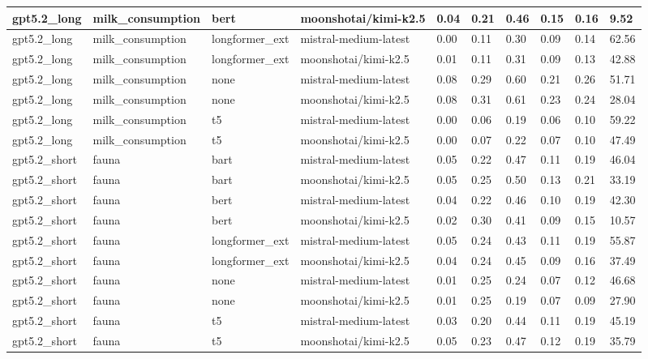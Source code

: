 \begin{tabular}{|l|l|l|l|l|l|l|l|l|l|}
 \hline
 gpt5.2\_long & milk\_consumption & bert & moonshotai/kimi-k2.5 & 0.04 & 0.21 & 0.46 & 0.15 & 0.16 & 9.52 \\
 \hline
 gpt5.2\_long & milk\_consumption & longformer\_ext & mistral-medium-latest & 0.00 & 0.11 & 0.30 & 0.09 & 0.14 & 62.56 \\
 \hline
 gpt5.2\_long & milk\_consumption & longformer\_ext & moonshotai/kimi-k2.5 & 0.01 & 0.11 & 0.31 & 0.09 & 0.13 & 42.88 \\
 \hline
 gpt5.2\_long & milk\_consumption & none & mistral-medium-latest & 0.08 & 0.29 & 0.60 & 0.21 & 0.26 & 51.71 \\
 \hline
 gpt5.2\_long & milk\_consumption & none & moonshotai/kimi-k2.5 & 0.08 & 0.31 & 0.61 & 0.23 & 0.24 & 28.04 \\
 \hline
 gpt5.2\_long & milk\_consumption & t5 & mistral-medium-latest & 0.00 & 0.06 & 0.19 & 0.06 & 0.10 & 59.22 \\
 \hline
 gpt5.2\_long & milk\_consumption & t5 & moonshotai/kimi-k2.5 & 0.00 & 0.07 & 0.22 & 0.07 & 0.10 & 47.49 \\
 \hline
 gpt5.2\_short & fauna & bart & mistral-medium-latest & 0.05 & 0.22 & 0.47 & 0.11 & 0.19 & 46.04 \\
 \hline
 gpt5.2\_short & fauna & bart & moonshotai/kimi-k2.5 & 0.05 & 0.25 & 0.50 & 0.13 & 0.21 & 33.19 \\
 \hline
 gpt5.2\_short & fauna & bert & mistral-medium-latest & 0.04 & 0.22 & 0.46 & 0.10 & 0.19 & 42.30 \\
 \hline
 gpt5.2\_short & fauna & bert & moonshotai/kimi-k2.5 & 0.02 & 0.30 & 0.41 & 0.09 & 0.15 & 10.57 \\
 \hline
 gpt5.2\_short & fauna & longformer\_ext & mistral-medium-latest & 0.05 & 0.24 & 0.43 & 0.11 & 0.19 & 55.87 \\
 \hline
 gpt5.2\_short & fauna & longformer\_ext & moonshotai/kimi-k2.5 & 0.04 & 0.24 & 0.45 & 0.09 & 0.16 & 37.49 \\
 \hline
 gpt5.2\_short & fauna & none & mistral-medium-latest & 0.01 & 0.25 & 0.24 & 0.07 & 0.12 & 46.68 \\
 \hline
 gpt5.2\_short & fauna & none & moonshotai/kimi-k2.5 & 0.01 & 0.25 & 0.19 & 0.07 & 0.09 & 27.90 \\
 \hline
 gpt5.2\_short & fauna & t5 & mistral-medium-latest & 0.03 & 0.20 & 0.44 & 0.11 & 0.19 & 45.19 \\
 \hline
 gpt5.2\_short & fauna & t5 & moonshotai/kimi-k2.5 & 0.05 & 0.23 & 0.47 & 0.12 & 0.19 & 35.79 \\

\end{tabular}
